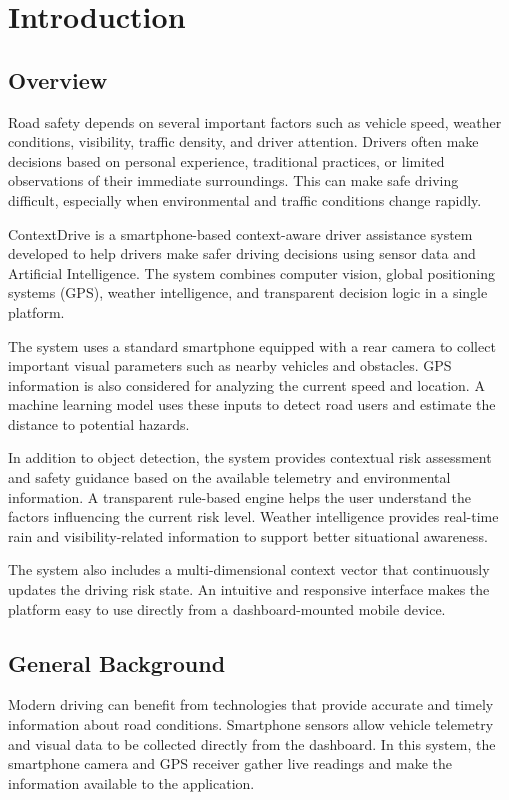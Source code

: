 \chapter{Introduction}

\section{Overview}

Road safety depends on several important factors such as vehicle speed, weather conditions, visibility, traffic density, and driver attention. Drivers often make decisions based on personal experience, traditional practices, or limited observations of their immediate surroundings. This can make safe driving difficult, especially when environmental and traffic conditions change rapidly.

ContextDrive is a smartphone-based context-aware driver assistance system developed to help drivers make safer driving decisions using sensor data and Artificial Intelligence. The system combines computer vision, global positioning systems (GPS), weather intelligence, and transparent decision logic in a single platform.

The system uses a standard smartphone equipped with a rear camera to collect important visual parameters such as nearby vehicles and obstacles. GPS information is also considered for analyzing the current speed and location. A machine learning model uses these inputs to detect road users and estimate the distance to potential hazards.

In addition to object detection, the system provides contextual risk assessment and safety guidance based on the available telemetry and environmental information. A transparent rule-based engine helps the user understand the factors influencing the current risk level. Weather intelligence provides real-time rain and visibility-related information to support better situational awareness.

The system also includes a multi-dimensional context vector that continuously updates the driving risk state. An intuitive and responsive interface makes the platform easy to use directly from a dashboard-mounted mobile device.

\section{General Background}

Modern driving can benefit from technologies that provide accurate and timely information about road conditions. Smartphone sensors allow vehicle telemetry and visual data to be collected directly from the dashboard. In this system, the smartphone camera and GPS receiver gather live readings and make the information available to the application.

